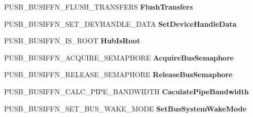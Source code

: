 \begin{DoxyCompactItemize}
\item 
\mbox{\label{struct___u_s_b___b_u_s___i_n_t_e_r_f_a_c_e___h_u_b___v6_a5c61808bf8e3c292356cd2d7f59fdd4e}} 
P\+U\+S\+B\+\_\+\+B\+U\+S\+I\+F\+F\+N\+\_\+\+F\+L\+U\+S\+H\+\_\+\+T\+R\+A\+N\+S\+F\+E\+RS {\bfseries Flush\+Transfers}
\item 
\mbox{\label{struct___u_s_b___b_u_s___i_n_t_e_r_f_a_c_e___h_u_b___v6_ab3850442592f23684ac690f3f76da638}} 
P\+U\+S\+B\+\_\+\+B\+U\+S\+I\+F\+F\+N\+\_\+\+S\+E\+T\+\_\+\+D\+E\+V\+H\+A\+N\+D\+L\+E\+\_\+\+D\+A\+TA {\bfseries Set\+Device\+Handle\+Data}
\item 
\mbox{\label{struct___u_s_b___b_u_s___i_n_t_e_r_f_a_c_e___h_u_b___v6_a98dc8ab486b0e9b18f5be31e809b51d5}} 
P\+U\+S\+B\+\_\+\+B\+U\+S\+I\+F\+F\+N\+\_\+\+I\+S\+\_\+\+R\+O\+OT {\bfseries Hub\+Is\+Root}
\item 
\mbox{\label{struct___u_s_b___b_u_s___i_n_t_e_r_f_a_c_e___h_u_b___v6_aba9773f253c21fbd7e0faa17e0ed860f}} 
P\+U\+S\+B\+\_\+\+B\+U\+S\+I\+F\+F\+N\+\_\+\+A\+C\+Q\+U\+I\+R\+E\+\_\+\+S\+E\+M\+A\+P\+H\+O\+RE {\bfseries Acquire\+Bus\+Semaphore}
\item 
\mbox{\label{struct___u_s_b___b_u_s___i_n_t_e_r_f_a_c_e___h_u_b___v6_af8aad5d4ec780b6f17f2ad22014d174c}} 
P\+U\+S\+B\+\_\+\+B\+U\+S\+I\+F\+F\+N\+\_\+\+R\+E\+L\+E\+A\+S\+E\+\_\+\+S\+E\+M\+A\+P\+H\+O\+RE {\bfseries Release\+Bus\+Semaphore}
\item 
\mbox{\label{struct___u_s_b___b_u_s___i_n_t_e_r_f_a_c_e___h_u_b___v6_a1077152175f07a634b69f7ed774588f3}} 
P\+U\+S\+B\+\_\+\+B\+U\+S\+I\+F\+F\+N\+\_\+\+C\+A\+L\+C\+\_\+\+P\+I\+P\+E\+\_\+\+B\+A\+N\+D\+W\+I\+D\+TH {\bfseries Caculate\+Pipe\+Bandwidth}
\item 
\mbox{\label{struct___u_s_b___b_u_s___i_n_t_e_r_f_a_c_e___h_u_b___v6_aea4c4a5830d0b702f969534aca873e76}} 
P\+U\+S\+B\+\_\+\+B\+U\+S\+I\+F\+F\+N\+\_\+\+S\+E\+T\+\_\+\+B\+U\+S\+\_\+\+W\+A\+K\+E\+\_\+\+M\+O\+DE {\bfseries Set\+Bus\+System\+Wake\+Mode}

\end{DoxyCompactItemize}
